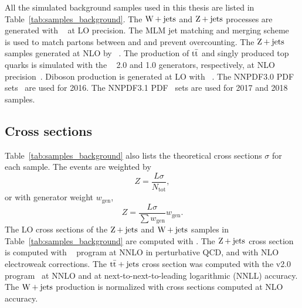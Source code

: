 All the simulated background samples used in this thesis are listed in Table~\ref{tab:samples_background}.
The ${{\text{W}}\hspace{-.04em}+\text{jets}}$ and ${{\text{Z}}\hspace{-.04em}+\text{jets}}$ processes are generated with \MADGRAPH~\cite{MadGraph} at LO precision.
The MLM jet matching and merging scheme~\cite{MLM} is used to match partons between \MADGRAPH and \PYTHIA and prevent overcounting.
The ${{\text{Z}}\hspace{-.04em}+\text{jets}}$ samples generated at NLO by \MGvATNLO~\cite{aMCatNLO}. 
The production of ${{\text{t}}{\bar{\text{t}}}}$ and singly produced top quarks is simulated with the \POWHEG~\cite{POWHEG0,POWHEG1,POWHEG2} 2.0 and 1.0 generators, respectively, at NLO precision~\cite{POWHEG_TT,POWHEG_TT2,POWHEG_ST_st,POWHEG_ST_tW}.
Diboson production is generated at LO with ~\cite{Pythia8,Pythia8_2015}.
The NNPDF3.0 PDF sets~\cite{NNPDF30} are used for 2016. The NNPDF3.1 PDF~\cite{NNPDF31} sets are used for 2017 and 2018 samples.

\subsection{Cross sections} \label{sec:background_xsecs}
Table~\ref{tab:samples_background} also lists the theoretical cross sections $\sigma$ for each sample.
The events are weighted by
\begin{equation} \label{eq:LsigmaN}
  Z = \frac{L\sigma}{N_\text{tot}},
\end{equation}
or with generator weight $w_\text{gen}$,
\begin{equation}
  Z = \frac{L\sigma}{\sum w_\text{gen}} w_\text{gen}.
\end{equation}
The LO cross sections of the ${{\text{Z}}\hspace{-.04em}+\text{jets}}$ and ${{\text{W}}\hspace{-.04em}+\text{jets}}$ samples in Table~\ref{tab:samples_background} are computed with \MADGRAPH.
The ${{\text{Z}}\hspace{-.04em}+\text{jets}}$ cross section is computed with \FEWZ~\cite{FEWZ} program at NNLO in perturbative QCD, and with NLO electroweak corrections.
The ${{\text{t}}{\bar{\text{t}}}}+\text{jets}$ cross section was computed with the {\Toppp}v2.0 program~\cite{sigma_TT,sigma_TT_TWiki} at NNLO and at next-to-next-to-leading logarithmic (NNLL) accuracy.
The ${{\text{W}}\hspace{-.04em}+\text{jets}}$ production is normalized with cross sections computed at NLO accuracy.
